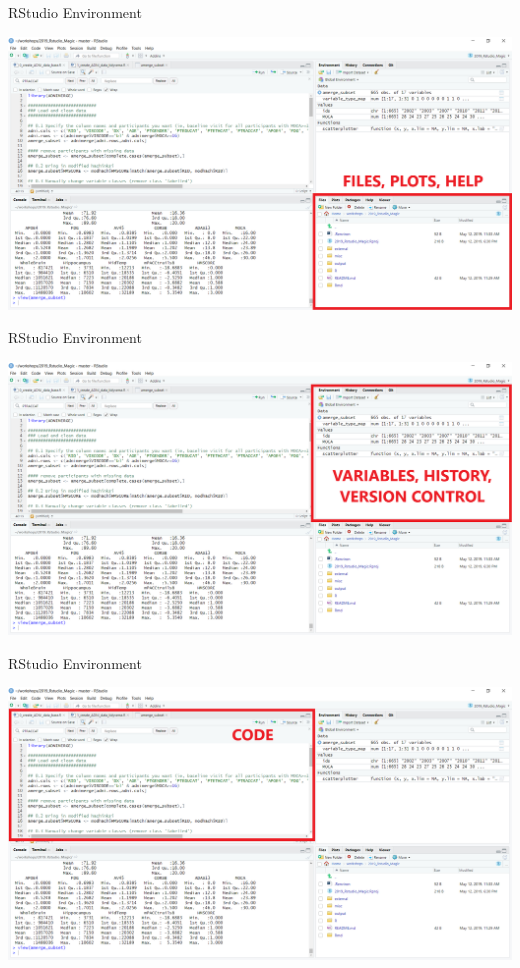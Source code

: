 \documentclass[
  ignorenonframetext,
]{beamer}
\begin{document}
\begin{frame}{RStudio Environment}
\protect\hypertarget{rstudio-environment-1}{}

\includegraphics{../external/images/rstudio_terminal_2_FILES.png}

\end{frame}

\begin{frame}{RStudio Environment}
\protect\hypertarget{rstudio-environment-2}{}

\includegraphics{../external/images/rstudio_terminal_3_ENV.png}

\end{frame}

\begin{frame}{RStudio Environment}
\protect\hypertarget{rstudio-environment-3}{}

\includegraphics{../external/images/rstudio_terminal_4_CODE.png}

\end{frame}
\end{document}
